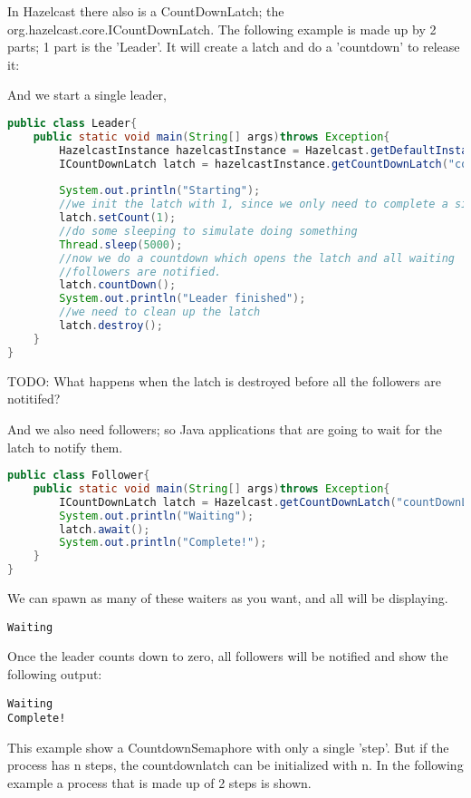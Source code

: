 In Hazelcast there also is a CountDownLatch; the org.hazelcast.core.ICountDownLatch. The following example is made up by 2 parts; 1 part is the 'Leader'. It will create a latch and do a 'countdown' to release it:

And we start a single leader, 
\begin{lstlisting}[language=java]
public class Leader{
    public static void main(String[] args)throws Exception{
        HazelcastInstance hazelcastInstance = Hazelcast.getDefaultInstance();
        ICountDownLatch latch = hazelcastInstance.getCountDownLatch("countDownLatch");
        
        System.out.println("Starting");
        //we init the latch with 1, since we only need to complete a single step.
        latch.setCount(1); 
        //do some sleeping to simulate doing something    
        Thread.sleep(5000);
        //now we do a countdown which opens the latch and all waiting
        //followers are notified.
        latch.countDown();
        System.out.println("Leader finished");
        //we need to clean up the latch
        latch.destroy();
    }
}
\end{lstlisting}

TODO: What happens when the latch is destroyed before all the followers are notitifed?

And we also need followers; so Java applications that are going to wait for the latch to notify them.

\begin{lstlisting}[language=java]
public class Follower{
    public static void main(String[] args)throws Exception{
        ICountDownLatch latch = Hazelcast.getCountDownLatch("countDownLatch");
        System.out.println("Waiting");
        latch.await();
        System.out.println("Complete!");
    }
}
\end{lstlisting}
We can spawn as many of these waiters as you want, and all will be displaying.

\begin{verbatim}
Waiting
\end{verbatim}

Once the leader counts down to zero, all followers will be notified and show the following output:

\begin{verbatim}
Waiting
Complete!
\end{verbatim}

This example show a CountdownSemaphore with only a single 'step'. But if the process has n steps, the countdownlatch can be initialized with n. In the following example a process that is made up of 2 steps is shown.

